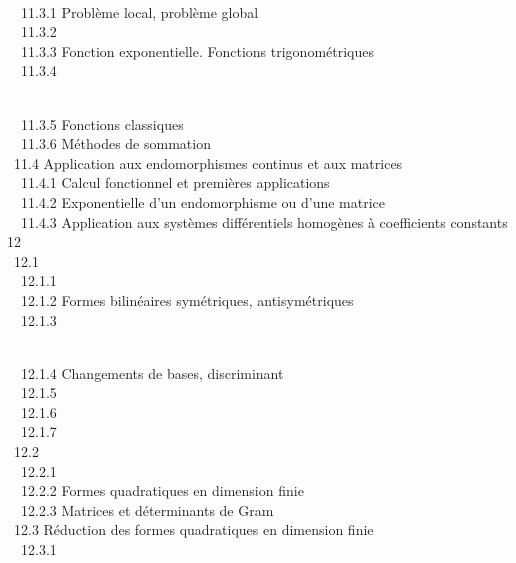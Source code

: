 \documentclass[]{article}
\begin{document}
\\ ~~11.3.1 {Problème local,
problème global} \\ ~~11.3.2
 \\
~~11.3.3 {Fonction exponentielle.
Fonctions trigonométriques} \\ ~~11.3.4

\\ ~~11.3.5 {Fonctions
classiques} \\ ~~11.3.6 {Méthodes
de sommation} \\ ~11.4 {Application
aux endomorphismes continus et aux matrices} \\ ~~11.4.1
{Calcul fonctionnel et premières
applications} \\ ~~11.4.2
{Exponentielle d'un endomorphisme
ou d'une matrice} \\ ~~11.4.3
{Application aux systèmes
différentiels homogènes à coefficients constants} \\ 12
 \\ ~12.1
 \\ ~~12.1.1
 \\ ~~12.1.2
{Formes bilinéaires symétriques,
antisymétriques} \\ ~~12.1.3

\\ ~~12.1.4 {Changements de
bases, discriminant} \\ ~~12.1.5
 \\ ~~12.1.6
 \\
~~12.1.7  \\ ~12.2
 \\ ~~12.2.1
 \\
~~12.2.2 {Formes quadratiques en
dimension finie} \\ ~~12.2.3
{Matrices et déterminants de
Gram} \\ ~12.3 {Réduction des
formes quadratiques en dimension finie} \\ ~~12.3.1
\end{document}
